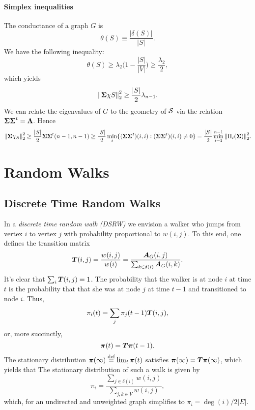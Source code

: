 \paragraph{Simplex inequalities}
The conductance of a graph $G$ is 
\begin{equation*}
    \theta(S) \equiv \frac{|\delta(S)|}{|S|}. 
\end{equation*}
We have the following inequality: 
\[\theta(S)\geq \lambda_2\bigg(1-\frac{|S|}{|V|}\bigg)\geq \frac{\lambda_2}{2},\]
which yields 
\[\norm{\boldsymbol{\Sigma} \chi S}_2^2 \geq \frac{|S|}{2}\lambda_{n-1}.\]
We can relate the eigenvalues of $G$ to the geometry of $\mathcal{S}$ via the relation $\boldsymbol{\Sigma}\boldsymbol{\Sigma}^t = \vb{\Lambda}$. Hence
\[\norm{\boldsymbol{\Sigma} \chi_S}_2^2 \geq \frac{|S|}{2} \boldsymbol{\Sigma}\boldsymbol{\Sigma}^t (n-1,n-1)\geq \frac{|S|}{2} \min_{i}\{(\boldsymbol{\Sigma}\boldsymbol{\Sigma}^t)(i,i):(\boldsymbol{\Sigma}\boldsymbol{\Sigma}^t)(i,i)\neq 0\} = \frac{|S|}{2}\min_{i=1}^{n-1} \norm{\Pi_i(\boldsymbol{\Sigma})}_2^2.  \]





\section{Random Walks}


\subsection{Discrete Time Random Walks}
In a \emph{discrete time random walk (DSRW)} we envision a walker who jumps from vertex $i$ to vertex $j$ with probability proportional to $w(i,j)$. To this end, one defines the transition matrix 
\begin{equation*}
    \vb*{T}(i,j) = \frac{w(i,j)}{w(i)}=\frac{\vb*{A}_G(i,j)}{\sum_{k\in\delta(i)} \vb*{A}_G(i,k)}.
\end{equation*}
It's clear that $\sum_i \vb*{T}(i,j)=1$. 
The probability that the walker is at node $i$ at time $t$ is the probability that that she was at node $j$ at time $t-1$ and transitioned to node $i$. Thus, 
\begin{equation*}
    \pi_i(t)=\sum_{j}\pi_j(t-1)\vb*{T}(i,j),
\end{equation*}
or, more succinctly, 
\begin{equation*}
    \boldsymbol{\pi}(t) = \vb*{T}\boldsymbol{\pi}(t-1).
\end{equation*}
The stationary distribution $\boldsymbol{\pi}(\infty)\overset{\text{def}}{=} \lim_t \boldsymbol{\pi}(t)$  satisfies $\boldsymbol{\pi}(\infty)=\vb*{T}\boldsymbol{\pi}(\infty)$,  which yields that 
The stationary distribution of such a walk is given by 
\[\pi_i = \frac{\sum_{j\in \delta(i)} w(i,j)}{\sum_{j,k\in V}w(i,j)},\]
which, for an undirected and unweighted graph simplifies to $\pi_i=\deg(i)/2|E|$. 


